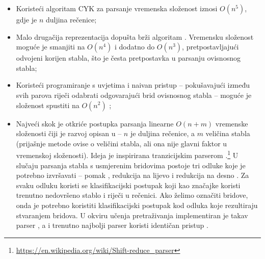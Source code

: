 \begin{itemize}
  \item Koristeći algoritam CYK za parsanje vremenska složenost iznosi
  $O(n^5)$, gdje je $n$ duljina rečenice;

  \item Malo drugačija reprezentacija dopušta brži algoritam
  \citep{eisner1999efficient}. Vremensku složenost moguće je smanjiti na
  $O(n^4)$ i dodatno do $O(n^3)$, pretpostavljajući odvojeni korijen 
  stabla, što je česta pretpostavka u parsanju ovisnosnog stabla;

  \item Koristeći programiranje s uvjetima  i
  naivan pristup -- pokušavajući između svih parova riječi odabrati odgovarajući
  brid ovisnosnog stabla -- moguće je složenost spustiti na $O(n^2)$
  \citep{covington2001fundamental};

  \item Najveći skok je otkriće postupka parsanja linearne $O(n + m)$
  vremenske složenosti čiji je razvoj opisan u \citep{nivre03efficient,
  zhang2011transition, bohnet2012transition} -- $n$ je duljina rečenice, a $m$
  veličina stabla (prijašnje metode ovise o veličini stabla, ali ona nije glavni
  faktor u vremenskoj složenosti). Ideja je inspirirana tranzicijskim parserom
  .\footnote{\url{https://en.wikipedia.org/wiki/Shift-reduce_parser}} U
  slučaju parsanja stabla s usmjerenim bridovima  postoje
  tri odluke koje je potrebno izvršavati -- pomak , redukcija na
  lijevo  i redukcija na desno . Za svaku
  odluku koristi se klasifikacijski postupak koji kao značajke koristi trenutno
  nedovršeno stablo i riječi u rečenici. Ako želimo označiti bridove, onda je
  potrebno koristiti klasifikacijski postupak kod odluka koje rezultiraju
  stvaranjem bridova. U okviru učenja pretraživanja implementiran je takav
  parser \citep{chang2015learning}, a i trenutno najbolji parser koristi
  identičan pristup \citep{andor2016globally}.

\end{itemize}

